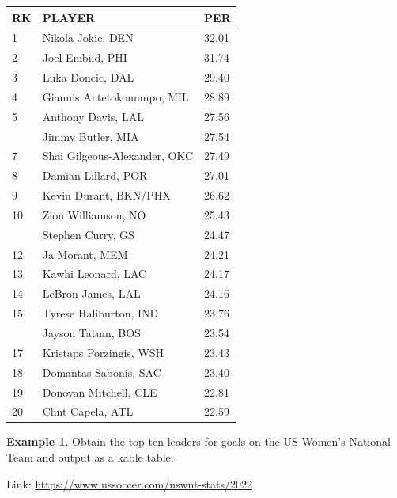\documentclass[
  11pt,
]{book}
\theoremstyle{definition}
\theoremstyle{definition}
\newtheorem{example}{Example}[chapter]
\theoremstyle{definition}
\theoremstyle{definition}
\theoremstyle{remark}
\begin{document}
\begin{tabular}{lll}
\toprule
RK & PLAYER & PER\\
\midrule
1 & Nikola Jokic, DEN & 32.01\\
2 & Joel Embiid, PHI & 31.74\\
3 & Luka Doncic, DAL & 29.40\\
4 & Giannis Antetokounmpo, MIL & 28.89\\
5 & Anthony Davis, LAL & 27.56\\
\addlinespace
6 & Jimmy Butler, MIA & 27.54\\
7 & Shai Gilgeous-Alexander, OKC & 27.49\\
8 & Damian Lillard, POR & 27.01\\
9 & Kevin Durant, BKN/PHX & 26.62\\
10 & Zion Williamson, NO & 25.43\\
\addlinespace
11 & Stephen Curry, GS & 24.47\\
12 & Ja Morant, MEM & 24.21\\
13 & Kawhi Leonard, LAC & 24.17\\
14 & LeBron James, LAL & 24.16\\
15 & Tyrese Haliburton, IND & 23.76\\
\addlinespace
16 & Jayson Tatum, BOS & 23.54\\
17 & Kristaps Porzingis, WSH & 23.43\\
18 & Domantas Sabonis, SAC & 23.40\\
19 & Donovan Mitchell, CLE & 22.81\\
20 & Clint Capela, ATL & 22.59\\
\bottomrule
\end{tabular}

\newpage

\begin{example}
Obtain the top ten leaders for goals on the US Women's National Team and output as a kable table.

Link: \url{https://www.ussoccer.com/uswnt-stats/2022}
\end{example}
\end{document}
